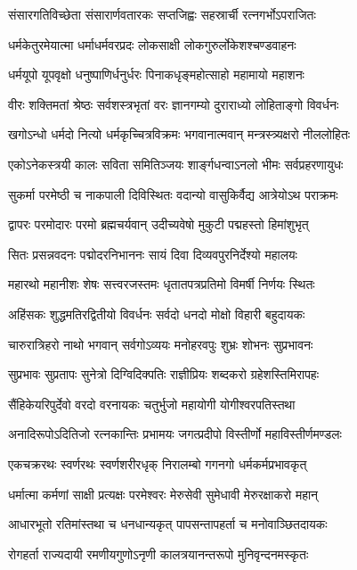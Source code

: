 \twolineshloka
{संसारगतिविच्छेता संसारार्णवतारकः}
{सप्तजिह्वः सहस्रार्ची रत्नगर्भोऽपराजितः}%

\twolineshloka
{धर्मकेतुरमेयात्मा धर्माधर्मवरप्रदः}
{लोकसाक्षी लोकगुरुर्लोकेशश्चण्डवाहनः}%

\twolineshloka
{धर्मयूपो यूपवृक्षो धनुष्पाणिर्धनुर्धरः}
{पिनाकधृङ्महोत्साहो महामायो महाशनः}%

\twolineshloka
{वीरः शक्तिमतां श्रेष्ठः सर्वशस्त्रभृतां वरः}
{ज्ञानगम्यो दुराराध्यो लोहिताङ्गो विवर्धनः}%

\twolineshloka
{खगोऽन्धो धर्मदो नित्यो धर्मकृच्चित्रविक्रमः}
{भगवानात्मवान् मन्त्रस्त्र्यक्षरो नीललोहितः}%

\twolineshloka
{एकोऽनेकस्त्रयी कालः सविता समितिञ्जयः}
{शार्ङ्गधन्वाऽनलो भीमः सर्वप्रहरणायुधः}%

\twolineshloka
{सुकर्मा परमेष्ठी च नाकपाली दिविस्थितः}
{वदान्यो वासुकिर्वैद्य आत्रेयोऽथ पराक्रमः}%

\twolineshloka
{द्वापरः परमोदारः परमो ब्रह्मचर्यवान्}
{उदीच्यवेषो मुकुटी पद्महस्तो हिमांशुभृत्}%

\twolineshloka
{सितः प्रसन्नवदनः पद्मोदरनिभाननः}
{सायं दिवा दिव्यवपुरनिर्देश्यो महालयः}%

\twolineshloka
{महारथो महानीशः शेषः सत्त्वरजस्तमः}
{धृतातपत्रप्रतिमो विमर्षी निर्णयः स्थितः}%

\twolineshloka
{अहिंसकः शुद्धमतिरद्वितीयो विवर्धनः}
{सर्वदो धनदो मोक्षो विहारी बहुदायकः}%

\twolineshloka
{चारुरात्रिहरो नाथो भगवान् सर्वगोऽव्ययः}
{मनोहरवपुः शुभ्रः शोभनः सुप्रभावनः}%

\twolineshloka
{सुप्रभावः सुप्रतापः सुनेत्रो दिग्विदिक्पतिः}
{राज्ञीप्रियः शब्दकरो ग्रहेशस्तिमिरापहः}%

\twolineshloka
{सैंहिकेयरिपुर्देवो वरदो वरनायकः}
{चतुर्भुजो महायोगी योगीश्वरपतिस्तथा}%

\twolineshloka
{अनादिरूपोऽदितिजो रत्नकान्तिः प्रभामयः}
{जगत्प्रदीपो विस्तीर्णो महाविस्तीर्णमण्डलः}%

\twolineshloka
{एकचक्ररथः स्वर्णरथः स्वर्णशरीरधृक्}
{निरालम्बो गगनगो धर्मकर्मप्रभावकृत्}%

\twolineshloka
{धर्मात्मा कर्मणां  साक्षी प्रत्यक्षः परमेश्वरः}
{मेरुसेवी सुमेधावी मेरुरक्षाकरो महान्}%

\twolineshloka
{आधारभूतो रतिमांस्तथा च धनधान्यकृत्}
{पापसन्तापहर्ता च मनोवाञ्छितदायकः}%

\twolineshloka
{रोगहर्ता राज्यदायी रमणीयगुणोऽनृणी}
{कालत्रयानन्तरूपो मुनिवृन्दनमस्कृतः}%

